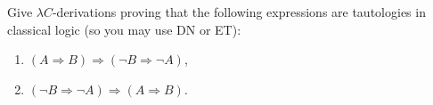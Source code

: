 \begin{problem}{7.3}
    Give $\lambda C$-derivations proving that the following expressions are tautologies in classical logic (so you may use DN or ET):
    \begin{enumerate}[label=$(\alph*)$]
    \item $(A\Rightarrow B)\Rightarrow(\neg B\Rightarrow\neg A)$,
    \item $(\neg B\Rightarrow\neg A)\Rightarrow(A\Rightarrow B)$.
    \end{enumerate}
\end{problem}